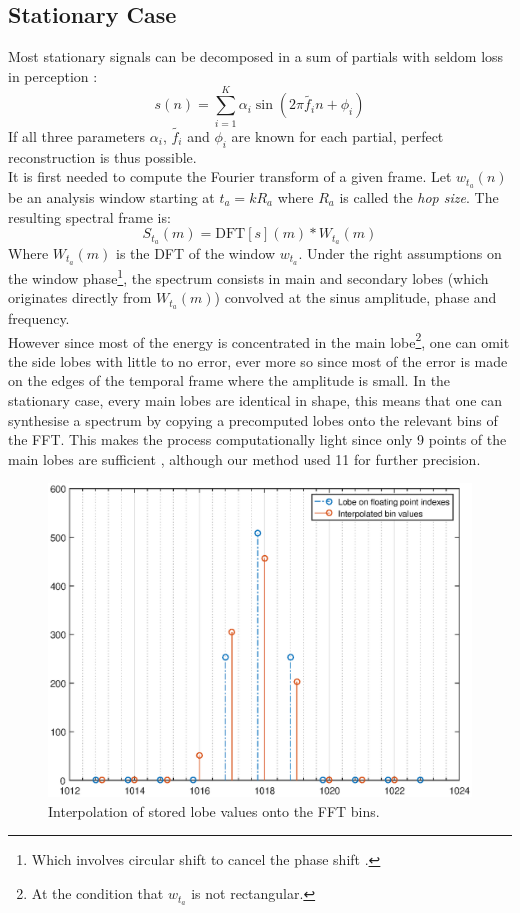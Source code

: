 \documentclass[]{article}
\begin{document}
\subsection{Stationary Case}
Most stationary signals can be decomposed in a sum of partials with seldom loss in perception :
\begin{equation}
s(n) = \sum_{i=1}^{K}\alpha_i \sin(2\pi \tilde{f_i} n + \phi_{i})
\end{equation}
If all three parameters $\alpha_i$, $\tilde{f_i}$ and $\phi_{i}$ are known for each partial, perfect reconstruction is thus possible.\\
It is first needed to compute the Fourier transform of a given frame. Let $w_{t_a}(n)$ be an analysis window starting at $t_a = kR_a$ where $R_a$ is called the \emph{hop size}. The resulting spectral frame is:
\begin{equation}
S_{t_a}(m) = \text{DFT}[s](m) \ast W_{t_a}(m)
\end{equation}
Where $W_{t_a}(m)$ is the DFT of the window $w_{t_a}$. Under the right assumptions on the window phase\footnote{Which involves circular shift to cancel the phase shift \cite{arfib2002time}.}, the spectrum consists in main and secondary lobes (which originates directly from $W_{t_a}(m)$) convolved at the sinus amplitude, phase and frequency.\\
However since most of the energy is concentrated in the main lobe\footnote{At the condition that $w_{t_a}$ is not rectangular.}, one can omit the side lobes with little to no error, ever more so since most of the error is made on the edges of the temporal frame where the amplitude is small. In the stationary case, every main lobes are identical in shape, this means that one can synthesise a spectrum by copying a precomputed lobes onto the relevant bins of the FFT. This makes the process computationally light since only 9 points of the main lobes are sufficient \cite{rodet1992spectral}, although our method used 11 for further precision.\\
\begin{figure}
	\centering
	\includegraphics[scale=0.4]{Interpolation.eps}
	\caption{Interpolation of stored lobe values onto the FFT bins.}
	\label{interpBin}
\end{figure}
\end{document}
